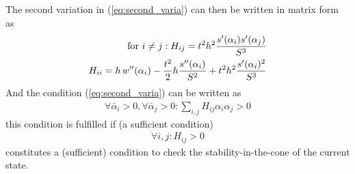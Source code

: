 \documentclass[]{article}
\begin{document}
The second variation in (\ref{eq:second_varia}) can then be written in matrix form as 
\begin{subequations}
\begin{align}
\label{eq:second_varia_discrete}
\text{ for } i \neq j: H_{ij} = \load^2 h^2  \frac{s'(\alpha_i) s'(\alpha_j)}{S^3} \\
%
H_{ii} = h\, w''(\alpha_i) - \frac{\load^2}{2} h  \frac{s''(\alpha_i)}{S^2}  + \load^2 h^2  \frac{s'(\alpha_i)^2}{S^3} 
\end{align} 
\end{subequations}
And the condition (\ref{eq:second_varia}) can be written as
\begin{align}
\label{eq:cond_second_varia_discrete}
\forall  \bar{\alpha}_i >0 , \forall  \bar{\alpha}_j >0  : \sum_{i,j} H_{ij} \alpha_i \alpha_j >0 
\end{align} 
this condition is fulfilled if  (a sufficient condition)
\begin{align}
\label{eq:cond_second_varia_discrete_bis}
\forall  i,j  :  H_{ij} >0 
\end{align} 
constitutes a (sufficient) condition to check the stability-in-the-cone of the current state.




%
%
%
%
%
%
%
%
%



%  
% 
\end{document}
